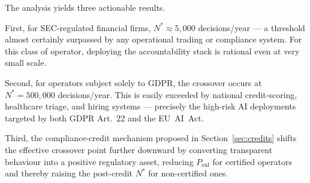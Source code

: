 The analysis yields three actionable results.

First, for SEC-regulated financial firms, $N^* \approx 5{,}000$
decisions/year --- a threshold almost certainly surpassed by any
operational trading or compliance system. For this class of operator,
deploying the accountability stack is rational even at very small scale.

Second, for operators subject solely to GDPR, the crossover occurs at
$N^* = 500{,}000$ decisions/year. This is easily exceeded by national
credit-scoring, healthcare triage, and hiring systems --- precisely the
high-risk AI deployments targeted by both GDPR Art.~22 and the EU~AI~Act.

Third, the compliance-credit mechanism proposed in
Section~\ref{sec:credits} shifts the effective crossover point further
downward by converting transparent behaviour into a positive regulatory
asset, reducing $P_{\text{enf}}$ for certified operators and thereby
raising the post-credit $N^*$ for non-certified ones.
